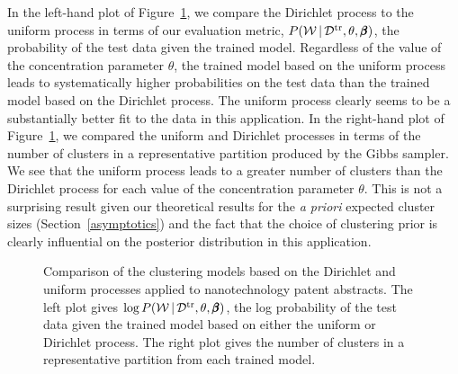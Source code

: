 \documentclass[]{article}
\begin{document}
In the left-hand plot of Figure~\ref{resultsfig}, we compare the Dirichlet process to the uniform process in terms of our evaluation metric, $P(\mathcal{W} \,|\, \mathcal{D}^{\textrm{tr}}, \theta, \pmb{\beta})$, the probability of the test data given the trained model.   Regardless of the value of the concentration parameter $\theta$, the trained model based on the uniform process leads to systematically higher probabilities on the test data than the trained model based on the Dirichlet process.   The uniform process clearly seems to be a substantially better fit to the data in this application.   In the right-hand plot of Figure~\ref{resultsfig}, we compared the uniform and Dirichlet processes in terms of the number of clusters in a representative partition produced by the Gibbs sampler.    We see that the uniform process leads to a greater number of clusters than the Dirichlet process for each value of the concentration parameter $\theta$.  This is not a surprising result given our theoretical results for the {\it a priori}  expected cluster sizes (Section~\ref{asymptotics}) and the fact that the choice of clustering prior is clearly influential on the posterior distribution in this application.  
\begin{figure}[ht]

\vspace{-0.5cm}

\begin{center}
\end{center}
\caption{Comparison of the clustering models based on the Dirichlet and uniform processes applied to nanotechnology patent abstracts.  The left plot gives $\log P(\mathcal{W} \,|\, \mathcal{D}^{\textrm{tr}}, \theta, \pmb{\beta})$, the log probability of the test data given the trained model based on either the uniform or Dirichlet process.  The right plot gives the number of clusters in a representative partition from each trained model. }\label{resultsfig}
\end{figure}
\end{document}
